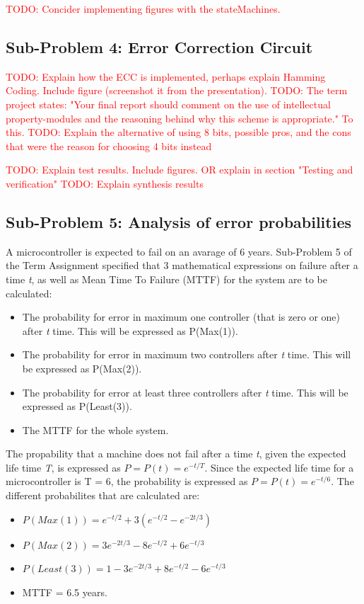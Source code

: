 \documentclass[a4paper]{IEEEtran}
\newcommand\TODO[1]{\textcolor{red}{TODO:#1}}
\newcommand\todo[1]{\TODO{#1}}
\begin{document}
\todo{ Concider implementing figures with the stateMachines.}

\subsection{Sub-Problem 4: Error Correction Circuit}
\todo{ Explain how the ECC is implemented, perhaps explain Hamming Coding. Include figure (screenshot it from the presentation). }
\break
\break
\todo{ The term project states: "Your final report should comment on the use of intellectual property-modules and the reasoning behind why this scheme is appropriate." To this.}
\break
\break
\todo{ Explain the alternative of using 8 bits, possible pros, and the cons that were the reason for choosing 4 bits instead} 
\break
\break

\todo{ Explain test results. Include figures. OR explain in section "Testing and verification" }
\break
\break
\todo{ Explain synthesis results}

\subsection{Sub-Problem 5: Analysis of error probabilities}
A microcontroller is expected to fail on an avarage of 6 years.
Sub-Problem 5 of the Term Assignment specified that 3 mathematical expressions on failure after a time \textit{t}, as well as Mean Time To Failure (MTTF) for the system are to be calculated:
\begin{itemize}
    \item The probability for error in maximum one controller (that is zero or one) after \textit{t} time. This will be expressed as P(Max(1)). 
    \item The probability for error in maximum two controllers after \textit{t} time. This will be expressed as P(Max(2)).
    \item The probability for error at least three controllers after \textit{t} time. This will be expressed as P(Least(3)).
    \item The MTTF for the whole system.
\end{itemize}

The propability that a machine does not fail after a time \textit{t}, given the expected life time \textit{T}, is expressed as $P = P(t) = e^{-t/T}$.
Since the expected life time for a microcontroller is T = 6, the probability is expressed as $P = P(t) = e^{-t/6}$. 
The different probabilites that are calculated are:
\begin{itemize}
    \item $P(Max(1)) = e^{-t/2}+3(e^{-t/2}-e^{-2t/3})$
    \item $P(Max(2)) = 3e^{-2t/3}-8e^{-t/2}+6e^{-t/3}$
    \item $P(Least(3)) = 1-3e^{-2t/3}+8e^{-t/2}-6e^{-t/3}$
    \item MTTF = 6.5 years.
\end{itemize}
\end{document}
